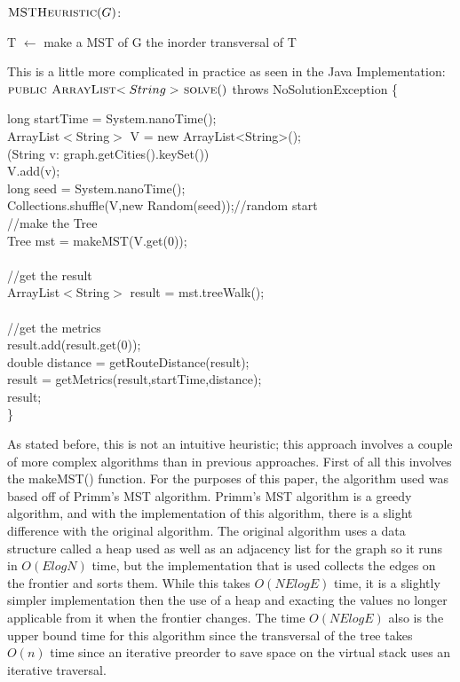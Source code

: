\documentclass[midd]{thesis}
\newcommand{\tab}{\hspace*{2em}}
\begin{document}
$\textnormal{\scshape MSTHeuristic}(G)$:
\begin{codebox}
\li T $\gets$ make a MST of G
\li \Return the inorder transversal of T
\end{codebox}
This is a little more complicated in practice as seen in the Java Implementation:\\
$\textnormal{\scshape public ArrayList$<String>$ solve}()$ throws NoSolutionException \{
\begin{codebox}
\tab long startTime = System.nanoTime();\\
\tab ArrayList$<$String$>$ V = new ArrayList<String>();\\
\tab \For(String v: graph.getCities().keySet())\\
\tab\tab V.add(v);\End\\
\tab long seed = System.nanoTime();\\
\tab Collections.shuffle(V,new Random(seed));//random start\\
\tab//make the Tree\\
\tab Tree mst = makeMST(V.get(0));\\\\
\tab//get the result\\
\tab ArrayList$<$String$>$ result = mst.treeWalk();\\\\	
\tab//get the metrics\\
\tab result.add(result.get(0));\\
\tab double distance = getRouteDistance(result);\\
\tab result = getMetrics(result,startTime,distance);\\
\Return result;\\
\}
\end{codebox}
\tab As stated before, this is not an intuitive heuristic; this approach involves a couple of more complex algorithms than in previous approaches. First of all this involves the makeMST() function. For the purposes of this paper, the algorithm used was based off of Primm's MST algorithm. Primm's MST algorithm is a greedy algorithm, and with the implementation of this algorithm, there is a slight difference with the original algorithm. The original algorithm uses a data structure called a heap used as well as an adjacency list for the graph so it runs in $O(ElogN)$ time, but the implementation that is used collects the edges on the frontier and sorts them. While this takes $O(NElogE)$ time, it is a slightly simpler implementation then the use of a heap and exacting the values no longer applicable from it when the frontier changes. The time $O(NElogE)$ also is the upper bound time for this algorithm since the transversal of the tree takes $O(n)$ time since an iterative preorder to save space on the virtual stack uses an iterative traversal.\\
\end{document}
